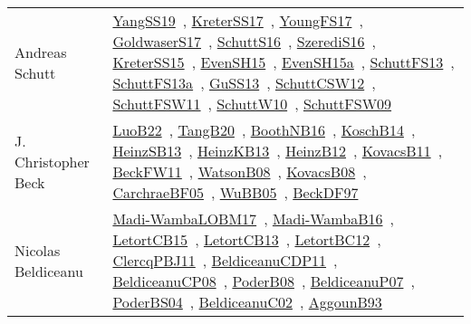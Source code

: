{\begin{longtable}{p{4cm}p{20cm}}
Andreas Schutt & \href{works/YangSS19.pdf}{YangSS19}~\cite{YangSS19}, \href{works/KreterSS17.pdf}{KreterSS17}~\cite{KreterSS17}, \href{works/YoungFS17.pdf}{YoungFS17}~\cite{YoungFS17}, \href{works/GoldwaserS17.pdf}{GoldwaserS17}~\cite{GoldwaserS17}, \href{works/SchuttS16.pdf}{SchuttS16}~\cite{SchuttS16}, \href{works/SzerediS16.pdf}{SzerediS16}~\cite{SzerediS16}, \href{works/KreterSS15.pdf}{KreterSS15}~\cite{KreterSS15}, \href{works/EvenSH15.pdf}{EvenSH15}~\cite{EvenSH15}, \href{works/EvenSH15a.pdf}{EvenSH15a}~\cite{EvenSH15a}, \href{works/SchuttFS13.pdf}{SchuttFS13}~\cite{SchuttFS13}, \href{works/SchuttFS13a.pdf}{SchuttFS13a}~\cite{SchuttFS13a}, \href{works/GuSS13.pdf}{GuSS13}~\cite{GuSS13}, \href{works/SchuttCSW12.pdf}{SchuttCSW12}~\cite{SchuttCSW12}, \href{works/SchuttFSW11.pdf}{SchuttFSW11}~\cite{SchuttFSW11}, \href{works/SchuttW10.pdf}{SchuttW10}~\cite{SchuttW10}, \href{works/SchuttFSW09.pdf}{SchuttFSW09}~\cite{SchuttFSW09}\\
J. Christopher Beck & \href{works/LuoB22.pdf}{LuoB22}~\cite{LuoB22}, \href{works/TangB20.pdf}{TangB20}~\cite{TangB20}, \href{works/BoothNB16.pdf}{BoothNB16}~\cite{BoothNB16}, \href{works/KoschB14.pdf}{KoschB14}~\cite{KoschB14}, \href{works/HeinzSB13.pdf}{HeinzSB13}~\cite{HeinzSB13}, \href{works/HeinzKB13.pdf}{HeinzKB13}~\cite{HeinzKB13}, \href{works/HeinzB12.pdf}{HeinzB12}~\cite{HeinzB12}, \href{works/KovacsB11.pdf}{KovacsB11}~\cite{KovacsB11}, \href{works/BeckFW11.pdf}{BeckFW11}~\cite{BeckFW11}, \href{works/WatsonB08.pdf}{WatsonB08}~\cite{WatsonB08}, \href{works/KovacsB08.pdf}{KovacsB08}~\cite{KovacsB08}, \href{works/CarchraeBF05.pdf}{CarchraeBF05}~\cite{CarchraeBF05}, \href{works/WuBB05.pdf}{WuBB05}~\cite{WuBB05}, \href{works/BeckDF97.pdf}{BeckDF97}~\cite{BeckDF97}\\
Nicolas Beldiceanu & \href{works/Madi-WambaLOBM17.pdf}{Madi-WambaLOBM17}~\cite{Madi-WambaLOBM17}, \href{works/Madi-WambaB16.pdf}{Madi-WambaB16}~\cite{Madi-WambaB16}, \href{works/LetortCB15.pdf}{LetortCB15}~\cite{LetortCB15}, \href{works/LetortCB13.pdf}{LetortCB13}~\cite{LetortCB13}, \href{works/LetortBC12.pdf}{LetortBC12}~\cite{LetortBC12}, \href{works/ClercqPBJ11.pdf}{ClercqPBJ11}~\cite{ClercqPBJ11}, \href{works/BeldiceanuCDP11.pdf}{BeldiceanuCDP11}~\cite{BeldiceanuCDP11}, \href{works/BeldiceanuCP08.pdf}{BeldiceanuCP08}~\cite{BeldiceanuCP08}, \href{works/PoderB08.pdf}{PoderB08}~\cite{PoderB08}, \href{works/BeldiceanuP07.pdf}{BeldiceanuP07}~\cite{BeldiceanuP07}, \href{works/PoderBS04.pdf}{PoderBS04}~\cite{PoderBS04}, \href{works/BeldiceanuC02.pdf}{BeldiceanuC02}~\cite{BeldiceanuC02}, \href{works/AggounB93.pdf}{AggounB93}~\cite{AggounB93}\\

\end{longtable}}
